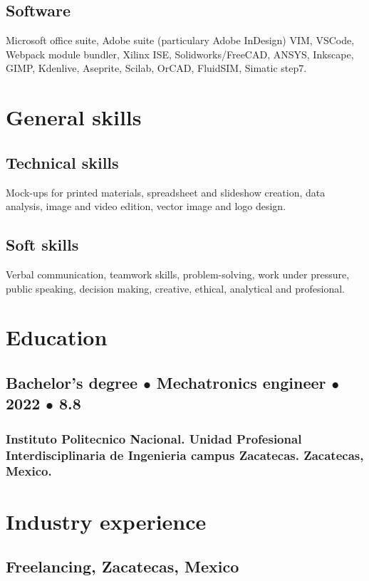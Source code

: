 \documentclass{article}
\begin{document}
    \subsection{Software}

    Microsoft office suite, Adobe suite (particulary Adobe InDesign) VIM, VSCode, Webpack module bundler, Xilinx ISE, Solidworks/FreeCAD, ANSYS, Inkscape, GIMP, Kdenlive, Aseprite, Scilab, OrCAD, FluidSIM, Simatic step7.


  \section{General skills}

  \subsection{Technical skills}
  Mock-ups for printed materials, spreadsheet and slideshow creation, data analysis, image and video edition, vector image and logo design.

  \subsection{Soft skills}
  Verbal communication, teamwork skills, problem-solving, work under pressure, public speaking, decision making, creative, ethical, analytical and profesional.%


  \section{Education}%

  \subsection{Bachelor's degree $\bullet$  Mechatronics engineer $\bullet$ 2022 $\bullet$ 8.8}
  \subsubsection{Instituto Politecnico Nacional.
  Unidad Profesional Interdisciplinaria de Ingenieria campus Zacatecas.
  Zacatecas, Mexico.}%


  \section{Industry experience}%

  \subsection{\textbf{Freelancing}, Zacatecas, Mexico}
\end{document}
